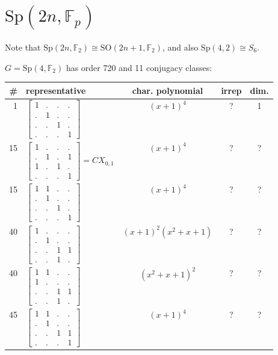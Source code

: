 \documentclass[11pt,oneside]{article}
\newcommand{\SO}{\mathrm{SO}}
\newcommand{\Sp}{\mathrm{Sp}}
\newcommand{\Field}{\mathbb{F}}
\begin{document}
\section{$\Sp(2n,\Field_p)$}

% 

Note that $\Sp(2n,\Field_2) \cong \SO(2n+1,\Field_2)$, and also $\Sp(4,2)\cong S_6$.

$G=\Sp(4,\Field_2)$ has order 720 and 11 conjugacy classes:
\begin{center}
\begin{tabular}{r|l|c|c|c}
\# & representative & char. polynomial & irrep & dim. \\
\hline
1  & $\begin{bmatrix}1&.&.&.\\.&1&.&.\\.&.&1&.\\.&.&.&1\end{bmatrix}$  & $(x+1)^4$  & ? & 1  \\
15  & $\begin{bmatrix}1&.&.&.\\.&1&.&1\\1&.&1&.\\.&.&.&1\end{bmatrix}=CX_{0,1}$
    & $(x+1)^4$  & ? & ?  \\
15  & $\begin{bmatrix}1&1&.&.\\.&1&.&.\\.&.&1&.\\.&.&.&1\end{bmatrix}$  & $(x+1)^4$  & ? & ?  \\
40  &  $\begin{bmatrix}1&.&.&.\\.&1&.&.\\.&.&1&1\\.&.&1&.\end{bmatrix}$   & $(x+1)^2(x^2+x+1)$  & ? & ?  \\
40  & $\begin{bmatrix}1&1&.&.\\1&.&.&.\\.&.&1&1\\.&.&1&.\end{bmatrix}$    & $(x^2+x+1)^2$  & ? & ?  \\
45  & $\begin{bmatrix}1&1&.&.\\.&1&.&.\\.&.&1&1\\.&.&.&1\end{bmatrix}$  & $(x+1)^4$  & ? & ?  \\

\end{tabular}
\end{center}
\end{document}
